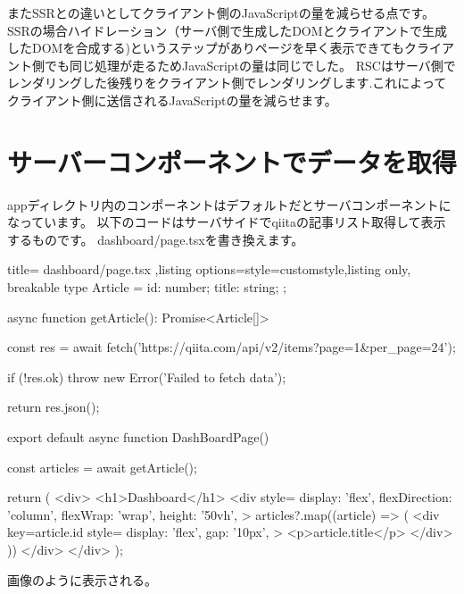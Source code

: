 またSSRとの違いとしてクライアント側のJavaScriptの量を減らせる点です。
SSRの場合ハイドレーション（サーバ側で生成したDOMとクライアントで生成したDOMを合成する)というステップがありページを早く表示できてもクライアント側でも同じ処理が走るためJavaScriptの量は同じでした。
RSCはサーバ側でレンダリングした後残りをクライアント側でレンダリングします.これによってクライアント側に送信されるJavaScriptの量を減らせます。


\section{サーバーコンポーネントでデータを取得}


appディレクトリ内のコンポーネントはデフォルトだとサーバコンポーネントになっています。
以下のコードはサーバサイドでqiitaの記事リスト取得して表示するものです。
dashboard/page.tsxを書き換えます。



\begin{tcblisting}{title={
        dashboard/page.tsx
      },listing options={style=customstyle},listing only, breakable}
  type Article = {
    id: number;
    title: string;
  };

  async function getArticle(): Promise<Article[]> {
    const res = await fetch('https://qiita.com/api/v2/items?page=1&per_page=24');

    if (!res.ok) {
        throw new Error('Failed to fetch data');
    }

    return res.json();
  }

  export default async function DashBoardPage() {
    const articles = await getArticle();

    return (
      <div>
        <h1>Dashboard</h1>
        <div
        style={{
            display: 'flex',
            flexDirection: 'column',
            flexWrap: 'wrap',
            height: '50vh',
          }}
        >
          {articles?.map((article) => (
            <div
            key={article.id}
            style={{
                display: 'flex',
                gap: '10px',
              }}
            >
              <p>{article.title}</p>
            </div>
            ))}
        </div>
      </div>
    );
  }


\end{tcblisting}






画像のように表示される。

